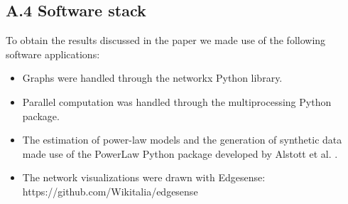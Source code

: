 \documentclass{nws}
\begin{document}
\subsection*{A.4 Software stack}

To obtain the results discussed in the paper we made use of the following software applications:
\begin{itemize}
\item Graphs were handled through the networkx Python library.
\item Parallel computation was handled through the multiprocessing Python package. 
\item The estimation of power-law models and the generation of synthetic data made use of the PowerLaw Python package developed by Alstott et al. \cite{alstott2014powerlaw}.
\item The network visualizations were drawn with Edgesense: https://github.com/Wikitalia/edgesense
\end{itemize}







\label{lastpage}
\end{document}
